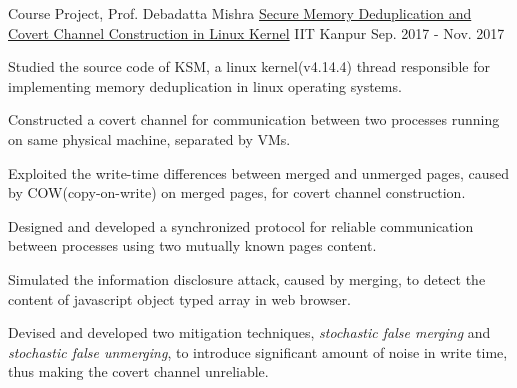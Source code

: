 \documentclass[11pt, a4paper]{cv}
\begin{document}

\begin{cventries}

  \cventry
    {Course Project, Prof. Debadatta Mishra} %
        {\href{http://home.iitk.ac.in/~shivansh/resources/secure-deduplication.pdf}{Secure Memory Deduplication and Covert Channel Construction in Linux Kernel}} %
    {IIT Kanpur} %
    {Sep. 2017 - Nov. 2017} %
    {
      \begin{cvitems} %
        \item {Studied the source code of KSM, a linux kernel(v4.14.4) thread responsible for implementing memory deduplication in linux operating systems.}
        \item {Constructed a covert channel for communication between two processes running on same physical machine, separated by VMs.}
        \item {Exploited the write-time differences between merged and unmerged pages, caused by COW(copy-on-write) on merged pages, for covert channel construction.}
        \item {Designed and developed a synchronized protocol for reliable communication between processes using two mutually known pages content.}
        \item {Simulated the information disclosure attack, caused by merging, to detect the content of javascript object typed array in web browser.}
        \item {Devised and developed two mitigation techniques, \textit{stochastic false merging} and \textit{stochastic false unmerging}, to introduce significant amount of noise in write time, thus making the covert channel unreliable.}
      \end{cvitems}
    }


\end{cventries}
\end{document}
